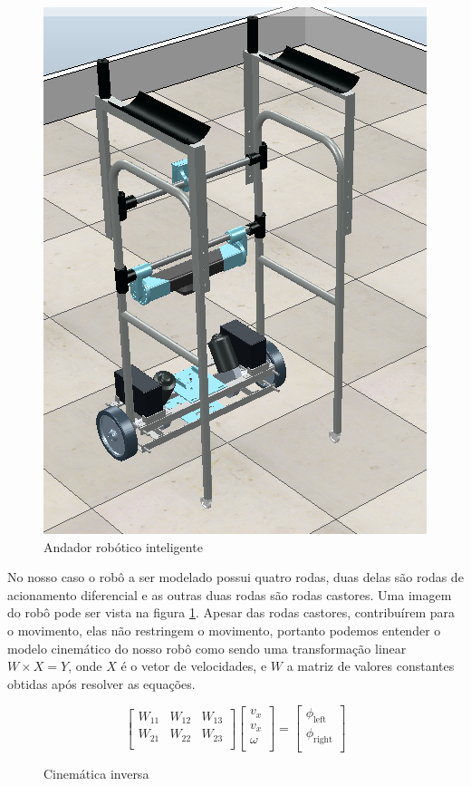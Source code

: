 \begin{figure}[H]
    \centering
    \includegraphics[scale=0.4]{figuras/smart_walker.png}
    \caption{Andador robótico inteligente}
    \label{fig:andador:robotico:inteligente}
\end{figure}


No nosso caso o robô a ser modelado possui quatro rodas, duas delas são
rodas de acionamento diferencial e as outras duas rodas são rodas castores.
Uma imagem do robô pode ser vista na figura \ref{fig:andador:robotico:inteligente}.
Apesar das rodas castores, contribuírem para o movimento, elas não restringem
o movimento, portanto podemos entender o modelo cinemático do nosso robô
como sendo uma transformação linear $W \times X = Y$, onde $X$ é o vetor
de velocidades, e $W$ a matriz de valores constantes obtidas após resolver
as equações.

\begin{figure}[H]
    \[
    \begin{bmatrix}
        W_{11} &  W_{12} & W_{13} \\
        W_{21} &  W_{22} & W_{23} \\
    \end{bmatrix}
    \begin{bmatrix}
        v_x \\
        v_x \\
        \omega \\
    \end{bmatrix}
    =
    \begin{bmatrix}
        \phi_{\text{left}} \\
        \phi_{\text{right}} \\
    \end{bmatrix}
\]
    \caption{Cinemática inversa}
\end{figure}



